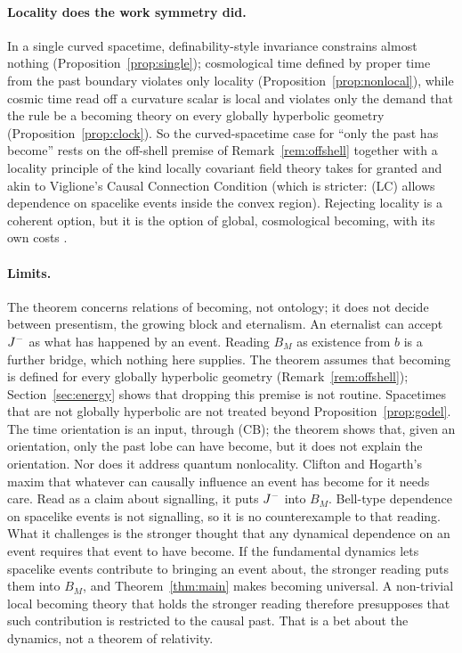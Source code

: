 \paragraph{Locality does the work symmetry did.} In a single curved spacetime,
definability-style invariance constrains almost nothing
(Proposition~\ref{prop:single}); cosmological time defined by proper time
from the past boundary violates only locality
(Proposition~\ref{prop:nonlocal}), while cosmic time read off a curvature
scalar is local and violates only the demand that the rule be a becoming
theory on every globally hyperbolic geometry
(Proposition~\ref{prop:clock}). So the
curved-spacetime case for ``only the past has become'' rests on the off-shell
premise of Remark~\ref{rem:offshell} together with a locality
principle of the kind locally covariant field theory takes for granted and
akin to Viglione's Causal Connection Condition \citep{Viglione2026} (which is
stricter: (LC) allows dependence on spacelike events inside the convex region). Rejecting
locality is a coherent option, but it is the option of global, cosmological
becoming, with its own costs \citep{Dieks2006,Viglione2026}.

\paragraph{Limits.} The theorem concerns relations of becoming, not
ontology; it does not decide between presentism, the growing block and
eternalism. An eternalist can accept $J^{-}$ as what has happened by an event.
Reading $B_M$ as existence from $b$ is a further bridge, which nothing here
supplies. The theorem assumes that becoming is defined for every globally hyperbolic
geometry (Remark~\ref{rem:offshell}); Section~\ref{sec:energy} shows that
dropping this premise is not routine. Spacetimes that are not globally hyperbolic are not treated beyond
Proposition~\ref{prop:godel}. The time orientation is an input, through (CB);
the theorem shows that, given an orientation, only the past lobe can have
become, but it does not explain the orientation. Nor does it address quantum
nonlocality. Clifton and Hogarth's maxim that whatever can causally influence
an event has become for it \citep[p.~364]{CH1995} needs care. Read as a claim
about signalling, it puts $J^{-}$ into $B_M$. Bell-type dependence on spacelike
events is not signalling, so it is no counterexample to that reading. What it
challenges is the stronger thought that any dynamical dependence on an event
requires that event to have become. If the fundamental dynamics lets spacelike
events contribute to bringing an event about, the stronger reading puts them
into $B_M$, and Theorem~\ref{thm:main} makes becoming universal. A non-trivial
local becoming theory that holds the stronger reading therefore presupposes that
such contribution is restricted to the causal past. That is a bet about the
dynamics, not a theorem of relativity.
